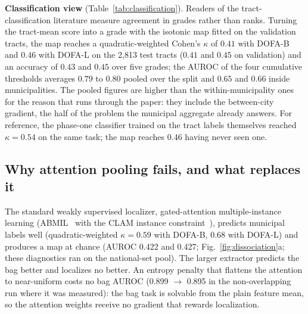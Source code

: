 \documentclass[11pt]{article}
\begin{document}


\textbf{Classification view} (Table~\ref{tab:classification}). Readers of the
tract-classification literature measure agreement in grades rather than ranks. Turning
the tract-mean score into a grade with the isotonic map fitted on the validation tracts,
the map reaches a quadratic-weighted Cohen's $\kappa$ of $0.41$ with DOFA-B and $0.46$
with DOFA-L on the 2{,}813 test tracts ($0.41$ and $0.45$ on validation) and an
accuracy of $0.43$ and $0.45$ over five grades; the AUROC of the four cumulative
thresholds averages $0.79$ to $0.80$ pooled over the split and $0.65$ and $0.66$ inside
municipalities. The pooled figures are higher than the within-municipality ones for the
reason that runs through the paper: they include the between-city gradient, the half of
the problem the municipal aggregate already answers. For reference, the phase-one
classifier trained on the tract labels themselves reached $\kappa = 0.54$ on the same
task; the map reaches $0.46$ having never seen one.



\subsection{Why attention pooling fails, and what replaces it}

The standard weakly supervised localizer, gated-attention multiple-instance learning
(ABMIL~\cite{ilse2018} with the CLAM instance constraint~\cite{lu2021}), predicts
municipal labels well (quadratic-weighted $\kappa = 0.59$ with DOFA-B, $0.68$ with
DOFA-L) and produces a map at chance (AUROC 0.422 and 0.427;
Fig.~\ref{fig:dissociation}a; these diagnostics ran on the national-set pool). The
larger extractor predicts the bag better and localizes no better. An entropy penalty
that flattens the attention to near-uniform costs no bag AUROC (0.899 $\to$ 0.895 in the
non-overlapping run where it was measured): the bag task is solvable from the plain
feature mean, so the attention weights receive no gradient that rewards localization.
\end{document}
